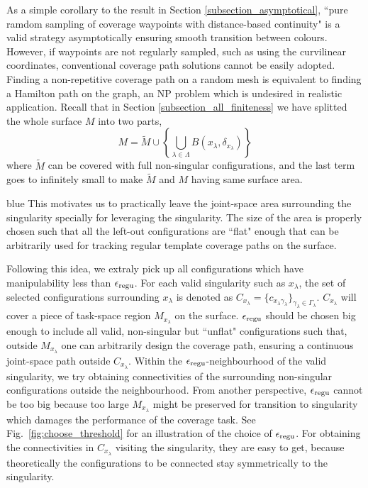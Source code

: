 \documentclass[Afour,sageh,times]{sagej}
\begin{document}
As a simple corollary to the result in Section \ref{subsection_asymptotical}, ``pure ramdom sampling of coverage waypoints with distance-based continuity" is a valid strategy asymptotically ensuring smooth transition between colours. 
However, if waypoints are not regularly sampled, such as using the curvilinear coordinates, conventional coverage path solutions cannot be easily adopted. 
Finding a non-repetitive coverage path on a random mesh is equivalent to finding a Hamilton path on the graph, an NP problem which is undesired in realistic application. 
Recall that in Section \ref{subsection_all_finiteness} we have splitted the whole surface $M$ into two parts, 
\begin{equation}
M = \tilde{M} \cup \left\{\bigcup\limits_{\lambda\in \Lambda}B(x_\lambda, \delta_{x_\lambda})\right\}
\end{equation}
where $\tilde{M}$ can be covered with full non-singular configurations, and the last term goes to infinitely small to make $\tilde{M}$ and $M$ having same surface area. 
\begin{color}{blue}
This motivates us to practically leave the joint-space area surrounding the singularity specially for leveraging the singularity. 
The size of the area is properly chosen such that all the left-out configurations are ``flat" enough that can be arbitrarily used for tracking regular template coverage paths on the surface. 

Following this idea, we extraly pick up all configurations which have manipulability less than $\epsilon_{\rm regu}$. 
For each valid singularity such as $x_\lambda$, the set of selected configurations surrounding $x_\lambda$ is denoted as $C_{x_\lambda} = \{c_{x_\lambda \gamma_\lambda}\}_{\gamma_\lambda \in \Gamma_\lambda}$. $C_{x_\lambda}$ will cover a piece of task-space region $M_{x_\lambda}$ on the surface. 
$\epsilon_{\rm regu}$ should be chosen big enough to include all valid, non-singular but ``unflat" configurations such that, outside $M_{x_\lambda}$ one can arbitrarily design the coverage path, ensuring a continuous joint-space path outside $C_{x_\lambda}$. 
Within the $\epsilon_{\rm regu}$-neighbourhood of the valid singularity, we try obtaining connectivities of the surrounding non-singular configurations outside the neighbourhood. 
From another perspective, $\epsilon_{\rm regu}$ cannot be too big because too large $M_{x_\lambda}$ might be preserved for transition to singularity which damages the performance of the coverage task.  
See Fig.~\ref{fig:choose_threshold} for an illustration of the choice of $\epsilon_{\rm regu}$. 
For obtaining the connectivities in $C_{x_\lambda}$ visiting the singularity, they are easy to get, because theoretically the configurations to be connected stay symmetrically to the singularity. 
\end{color}
\end{document}
